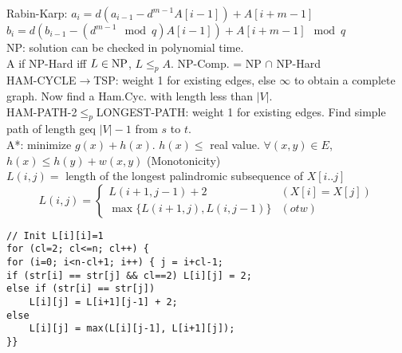 \documentclass[10pt]{report}
\begin{document}
\begin{multicols}{2}
Rabin-Karp: $a_i = d(a_{i-1} -d^{m-1}A[i-1]) + A[i+m-1]$\\
$b_i = d (b_{i-1}-(d^{m-1} \mod q) A[i-1]) + A[i+m-1] \mod q$\\
NP: solution can be checked in polynomial time.\\
A if NP-Hard iff $L\in \rm{NP}$, $L\leq_p A$. NP-Comp. = NP $\cap$ NP-Hard\\
HAM-CYCLE$\rightarrow$TSP: weight 1 for existing edges, else $\infty$ to obtain a complete graph. Now find a Ham.Cyc. with length less than $|V|$.\\
HAM-PATH-2$\leq_p$LONGEST-PATH: weight 1 for existing edges. Find simple path of length geq $|V|-1$ from $s$ to $t$.\\
A*: minimize $g(x)+h(x)$. $h(x)\leq$ real value. $\forall (x, y)\in E$, $h(x)\leq h(y)+w(x, y)$ (Monotonicity)\\
$L(i,j)=$ length of the longest palindromic subsequence of $X[i..j]$
$$L(i, j) = \begin{cases}
	L(i+1, j-1) + 2 & (X[i] = X[j]) \\
	\max\{L(i+1, j), L(i, j-1)\} & (otw)
\end{cases}$$

\begin{lstlisting}[style=Cstyle]
// Init L[i][i]=1
for (cl=2; cl<=n; cl++) { 
for (i=0; i<n-cl+1; i++) { j = i+cl-1; 
if (str[i] == str[j] && cl==2) L[i][j] = 2; 
else if (str[i] == str[j]) 
	L[i][j] = L[i+1][j-1] + 2; 
else
	L[i][j] = max(L[i][j-1], L[i+1][j]); 
}} 
\end{lstlisting}
\end{multicols}
\end{document}
